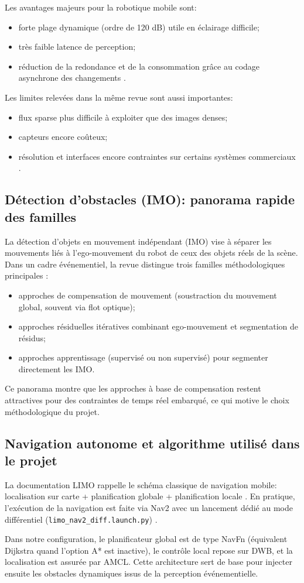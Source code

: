 Les avantages majeurs pour la robotique mobile sont:
\begin{itemize}
\item forte plage dynamique (ordre de 120 dB) utile en éclairage difficile;
\item très faible latence de perception;
\item réduction de la redondance et de la consommation grâce au codage
asynchrone des changements \cite{novoa2024review}.
\end{itemize}

Les limites relevées dans la même revue sont aussi importantes:
\begin{itemize}
\item flux sparse plus difficile à exploiter que des images denses;
\item capteurs encore coûteux;
\item résolution et interfaces encore contraintes sur certains systèmes
commerciaux \cite{novoa2024review}.
\end{itemize}

\subsection{Détection d'obstacles (IMO): panorama rapide des familles}
La détection d'objets en mouvement indépendant (IMO) vise à séparer les
mouvements liés à l'ego-mouvement du robot de ceux des objets réels de la
scène. Dans un cadre événementiel, la revue distingue trois familles
méthodologiques principales \cite{novoa2024review}:
\begin{itemize}
\item approches de compensation de mouvement (soustraction du mouvement global,
souvent via flot optique);
\item approches résiduelles itératives combinant ego-mouvement et segmentation
de résidus;
\item approches apprentissage (supervisé ou non supervisé) pour segmenter
directement les IMO.
\end{itemize}

Ce panorama montre que les approches à base de compensation restent attractives
pour des contraintes de temps réel embarqué, ce qui motive le choix méthodologique
du projet.

\subsection{Navigation autonome et algorithme utilisé dans le projet}
La documentation LIMO rappelle le schéma classique de navigation mobile:
localisation sur carte + planification globale + planification locale
\cite{limo_ros2_doc}. En pratique, l'exécution de la navigation est faite via
Nav2 avec un lancement dédié au mode différentiel
(\texttt{limo\_nav2\_diff.launch.py}) \cite{limo_ros2_doc}.

Dans notre configuration, le planificateur global est de type NavFn
(équivalent Dijkstra quand l'option A* est inactive), le contrôle local repose
sur DWB, et la localisation est assurée par AMCL. Cette architecture sert de
base pour injecter ensuite les obstacles dynamiques issus de la perception
événementielle.
